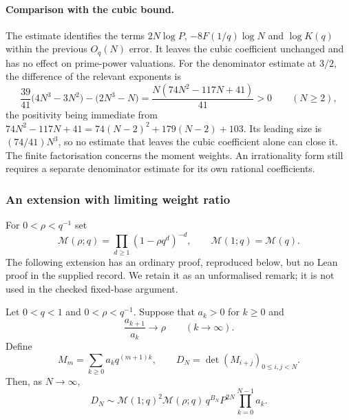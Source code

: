 \documentclass[11pt]{article}
\begin{document}
\paragraph{Comparison with the cubic bound.}
The estimate identifies the terms $2N\log P$, $-8F(1/q)\log N$
and $\log K(q)$ within the previous $O_q(N)$ error. It leaves the
cubic coefficient unchanged and has no effect on prime-power
valuations. For the denominator estimate at $3/2$, the difference
of the relevant exponents is
\[
 \frac{39}{41}\bigl(4N^3-3N^2\bigr)-\bigl(2N^3-N\bigr)
 =\frac{N(74N^2-117N+41)}{41}>0\qquad(N\ge2),
\]
the positivity being immediate from
$74N^2-117N+41=74(N-2)^2+179(N-2)+103$. Its leading size is $(74/41)N^3$, so no
estimate that leaves the cubic coefficient alone can close it. The finite factorisation concerns the moment weights. An irrationality
form still requires a separate denominator estimate for its own
rational coefficients.


\subsubsection*{An extension with limiting weight ratio}

For $0<\rho<q^{-1}$ set
\[
 \mathcal M(\rho;q)=\prod_{d\ge1}(1-\rho q^d)^{-d},
 \qquad \mathcal M(1;q)=\mathcal M(q).
\]
The following extension has an ordinary proof, reproduced below, but no
Lean proof in the supplied record. We retain it as an unformalised
remark; it is not used in the checked fixed-base argument.

\begin{remark}\label{long1049:thm:geometric-ratio}
Let $0<q<1$ and $0<\rho<q^{-1}$. Suppose that $a_k>0$ for $k\ge0$ and
\[
 \frac{a_{k+1}}{a_k}\longrightarrow\rho\qquad(k\to\infty).
\]
Define
\[
 M_m=\sum_{k\ge0}a_kq^{(m+1)k},\qquad
 D_N=\det(M_{i+j})_{0\le i,j<N}.
\]
Then, as $N\to\infty$,
\begin{equation}\label{long1049:eq:ratio-limit}
 D_N\sim \mathcal M(1;q)^2\mathcal M(\rho;q)\,
 q^{B_N}P^{2N}\prod_{k=0}^{N-1}a_k.
\end{equation}
\end{remark}
\end{document}
